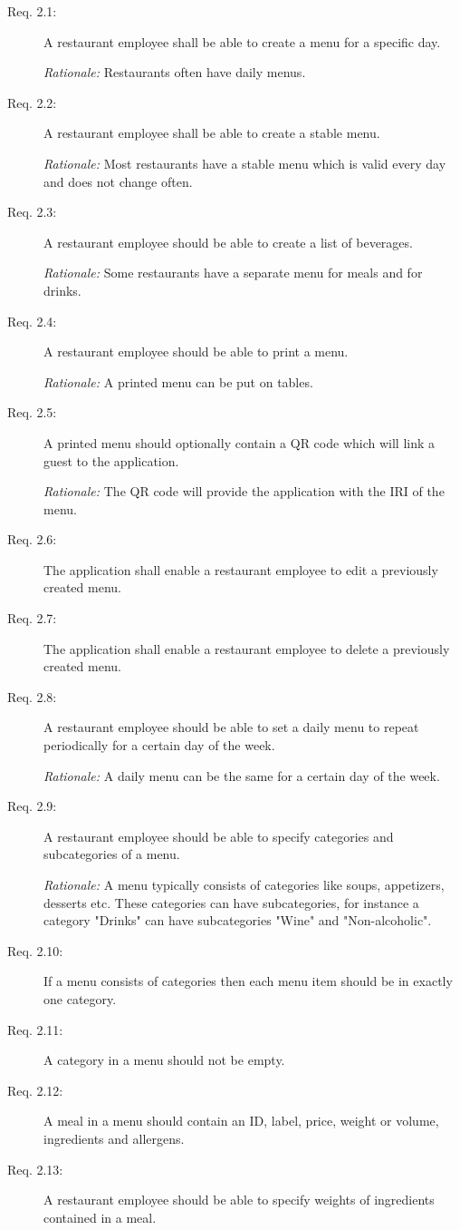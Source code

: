 \begin{description}
    \item [Req. 2.1:] A restaurant employee shall be able to create a menu for a specific day.

    \emph{Rationale:} Restaurants often have daily menus.
    \item [Req. 2.2:] A restaurant employee shall be able to create a stable menu.

    \emph{Rationale:} Most restaurants have a stable menu which is valid every day and does not change often.
    \item [Req. 2.3:] A restaurant employee should be able to create a list of beverages.

    \emph{Rationale:} Some restaurants have a separate menu for meals and for drinks.
    \item [Req. 2.4:] A restaurant employee should be able to print a menu.

    \emph{Rationale:} A printed menu can be put on tables.
    \item [Req. 2.5:] A printed menu should optionally contain a QR code which will link a guest to the application.

    \emph{Rationale:} The QR code will provide the application with the IRI of the menu.
    \item [Req. 2.6:] The application shall enable a restaurant employee to edit a previously created menu.
    \item [Req. 2.7:] The application shall enable a restaurant employee to delete a previously created menu.
    \item [Req. 2.8:] A restaurant employee should be able to set a daily menu to repeat periodically for a certain day of the week.

    \emph{Rationale:} A daily menu can be the same for a certain day of the week.
    \item [Req. 2.9:] A restaurant employee should be able to specify categories and subcategories of a menu.

    \emph{Rationale:} A menu typically consists of categories like soups, appetizers, desserts etc. These categories can have subcategories, for instance a category "Drinks" can have subcategories "Wine" and "Non-alcoholic".
    \item [Req. 2.10:] If a menu consists of categories then each menu item should be in exactly one category.
    \item [Req. 2.11:] A category in a menu should not be empty.   
    \item [Req. 2.12:] A meal in a menu should contain an ID, label, price, weight or volume, ingredients and allergens.
    \item [Req. 2.13:] A restaurant employee should be able to specify weights of ingredients contained in a meal.


\end{description}
